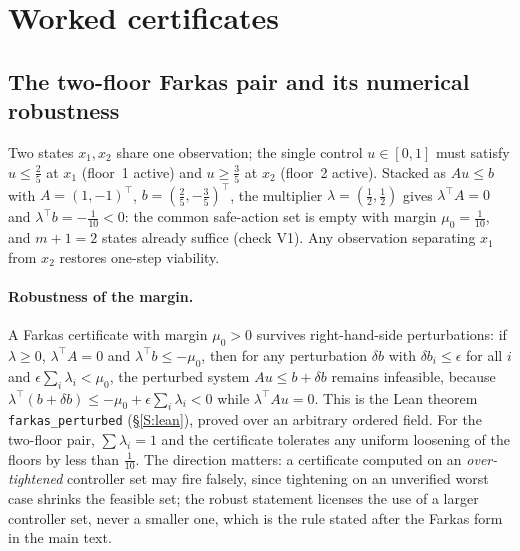 \section{Worked certificates}\label{S:worked}

\subsection{The two-floor Farkas pair and its numerical robustness}\label{S:farkas}
Two states $x_1,x_2$ share one observation; the single control $u\in[0,1]$ must satisfy $u\le\tfrac25$ at $x_1$ (floor~1 active) and $u\ge\tfrac35$ at $x_2$ (floor~2 active). Stacked as $Au\le b$ with $A=(1,-1)^\top$, $b=(\tfrac25,-\tfrac35)^\top$, the multiplier $\lambda=(\tfrac12,\tfrac12)$ gives $\lambda^\top A=0$ and $\lambda^\top b=-\tfrac1{10}<0$: the common safe-action set is empty with margin $\mu_0=\tfrac1{10}$, and $m+1=2$ states already suffice (check V1). Any observation separating $x_1$ from $x_2$ restores one-step viability.

\paragraph{Robustness of the margin.} A Farkas certificate with margin $\mu_0>0$ survives right-hand-side perturbations: if $\lambda\ge0$, $\lambda^\top A=0$ and $\lambda^\top b\le-\mu_0$, then for any perturbation $\delta b$ with $\delta b_i\le\epsilon$ for all $i$ and $\epsilon\sum_i\lambda_i<\mu_0$, the perturbed system $Au\le b+\delta b$ remains infeasible, because $\lambda^\top(b+\delta b)\le-\mu_0+\epsilon\sum_i\lambda_i<0$ while $\lambda^\top Au=0$. This is the Lean theorem \texttt{farkas\_perturbed} (\S\ref{S:lean}), proved over an arbitrary ordered field. For the two-floor pair, $\sum\lambda_i=1$ and the certificate tolerates any uniform loosening of the floors by less than $\tfrac1{10}$. The direction matters: a certificate computed on an \emph{over-tightened} controller set may fire falsely, since tightening on an unverified worst case shrinks the feasible set; the robust statement licenses the use of a larger controller set, never a smaller one, which is the rule stated after the Farkas form in the main text.

